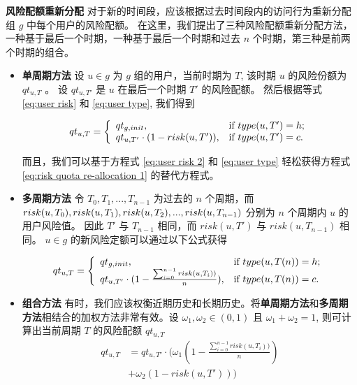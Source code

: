 \textbf{风险配额重新分配} 对于新的时间段，应该根据过去时间段内的访问行为重新分配组 $g$ 中每个用户的风险配额。 在这里，我们提出了三种风险配额重新分配方法，一种基于最后一个时期，一种基于最后一个时期和过去 $n$ 个时期，第三种是前两个时期的组合。

\begin{itemize}
	\item \textbf{单周期方法} 设 $u \in g$ 为 $g$ 组的用户，当前时期为 $T$, 该时期 $u$ 的风险份额为 $qt_{u,T}$ 。 设 $qt_{u,T'}$ 是 $u$ 在最后一个时期 $T'$ 的风险配额。
	然后根据等式 \ref{eq:user risk} 和 \ref{eq:user type}, 我们得到
	\begin{small}
		\begin{equation}\label{eq:risk quota re-allocation 1}
		qt_{u,T}=
		\left\{
		\begin{array}{ll}
		qt_{g,init}, & \hbox{if $type(u,T')=h$;} \\
		qt_{u,T'}\cdot (1-risk(u,T')), & \hbox{if $type(u,T')=c$.} \\
		\end{array}
		\right.
		\end{equation}
	\end{small}
	而且，我们可以基于方程式 \ref{eq:user risk 2} 和 \ref{eq:user type} 轻松获得方程式 \ref{eq:risk quota re-allocation 1} 的替代方程式。
	\item \textbf{多周期方法} 令 $T_0,T_1,...,T_{n-1}$ 为过去的 $n$ 个周期，而 $risk(u,T_0),risk(u,T_1),risk(u,T_2),..., \\risk(u,T_{n-1})$ 分别为 $n$ 个周期内 $u$ 的用户风险值。 因此 $T'$ 与 $T_{n-1}$ 相同，而 $risk(u,T')$ 与 $risk(u,T_{n-1})$ 相同。 $u \in g$ 的新风险定额可以通过以下公式获得
	
	\begin{footnotesize}
		\begin{equation}\label{eq:risk quota re-allocation 2}
		qt_{u,T}=
		\left\{
		\begin{array}{ll}
		qt_{g,init}, & \hbox{if $type(u,T(n))=h$;} \\
		qt_{u,T'}\cdot (1-\frac{ \sum _{i=0} ^ {n-1}risk(u,T_i))}{n}), & \hbox{if $type(u,T(n))=c$.} \\
		\end{array}
		\right.
		\end{equation}
	\end{footnotesize}
	
	\item \textbf{组合方法} 有时，我们应该权衡近期历史和长期历史。将\textbf{单周期方法}和\textbf{多周期方法}相结合的加权方法非常有效。设 $\omega_1, \omega_2 \in (0,1)$ 且 $\omega_1+ \omega_2 =1$, 则可计算出当前周期 $T$ 的风险配额 $qt_{u,T}$ 
	\begin{equation}\label{eq:risk quota re-allocation 3}
	\begin{aligned}
	qt_{u,T} &= qt_{u,T'}\cdot (\omega_1(1-\frac{ \sum _{i=0} ^ {n-1}risk(u,T_i))}{n}) \\
	&+ \omega_2(1-risk(u,T')))
	\end{aligned}
	\end{equation}
\end{itemize}

